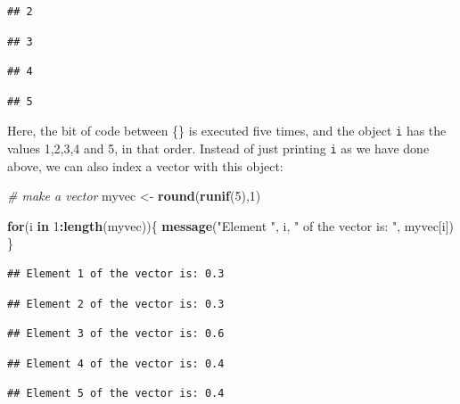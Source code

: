\documentclass[]{book}
\newenvironment{Shaded}{\begin{snugshade}}{\end{snugshade}}
\newcommand{\CommentTok}[1]{\textcolor[rgb]{0.56,0.35,0.01}{\textit{#1}}}
\newcommand{\ControlFlowTok}[1]{\textcolor[rgb]{0.13,0.29,0.53}{\textbf{#1}}}
\newcommand{\DecValTok}[1]{\textcolor[rgb]{0.00,0.00,0.81}{#1}}
\newcommand{\KeywordTok}[1]{\textcolor[rgb]{0.13,0.29,0.53}{\textbf{#1}}}
\newcommand{\NormalTok}[1]{#1}
\newcommand{\OperatorTok}[1]{\textcolor[rgb]{0.81,0.36,0.00}{\textbf{#1}}}
\newcommand{\StringTok}[1]{\textcolor[rgb]{0.31,0.60,0.02}{#1}}
\begin{document}
\begin{verbatim}
## 2
\end{verbatim}

\begin{verbatim}
## 3
\end{verbatim}

\begin{verbatim}
## 4
\end{verbatim}

\begin{verbatim}
## 5
\end{verbatim}

Here, the bit of code between \{\} is executed five times, and the object \texttt{i} has the values 1,2,3,4 and 5, in that order. Instead of just printing \texttt{i} as we have done above, we can also index a vector with this object:

\begin{Shaded}
\begin{Highlighting}[]
\CommentTok{# make a vector}
\NormalTok{myvec <-}\StringTok{ }\KeywordTok{round}\NormalTok{(}\KeywordTok{runif}\NormalTok{(}\DecValTok{5}\NormalTok{),}\DecValTok{1}\NormalTok{)}

\ControlFlowTok{for}\NormalTok{(i }\ControlFlowTok{in} \DecValTok{1}\OperatorTok{:}\KeywordTok{length}\NormalTok{(myvec))\{}
  \KeywordTok{message}\NormalTok{(}\StringTok{"Element "}\NormalTok{, i, }\StringTok{" of the vector is: "}\NormalTok{, myvec[i])}
\NormalTok{\}}
\end{Highlighting}
\end{Shaded}

\begin{verbatim}
## Element 1 of the vector is: 0.3
\end{verbatim}

\begin{verbatim}
## Element 2 of the vector is: 0.3
\end{verbatim}

\begin{verbatim}
## Element 3 of the vector is: 0.6
\end{verbatim}

\begin{verbatim}
## Element 4 of the vector is: 0.4
\end{verbatim}

\begin{verbatim}
## Element 5 of the vector is: 0.4
\end{verbatim}
\end{document}
